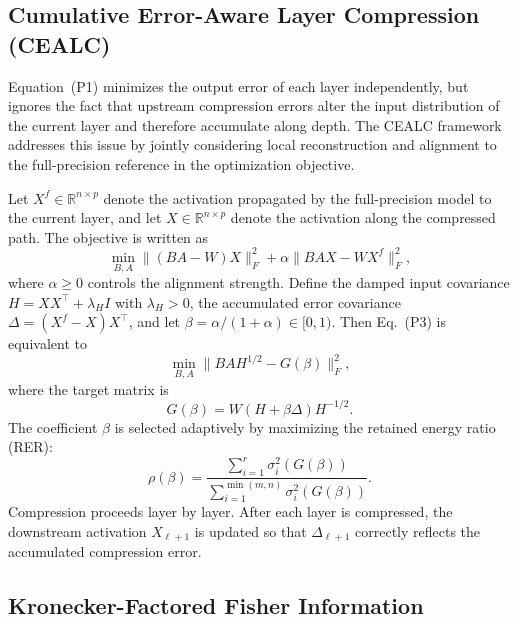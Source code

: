 \documentclass[a4paper,fleqn]{cas-dc}
\begin{document}
\subsection{Cumulative Error-Aware Layer Compression (CEALC)}

Equation~(P1) minimizes the output error of each layer independently, but ignores the fact that upstream compression errors alter the input distribution of the current layer and therefore accumulate along depth. The CEALC framework addresses this issue by jointly considering local reconstruction and alignment to the full-precision reference in the optimization objective.

Let $X^f \in \mathbb{R}^{n \times p}$ denote the activation propagated by the full-precision model to the current layer, and let $X \in \mathbb{R}^{n \times p}$ denote the activation along the compressed path. The objective is written as
\begin{equation}
\min_{B,A} \|(BA - W)X\|_F^2 + \alpha \|BAX - WX^f\|_F^2,
\tag{P3}
\end{equation}
where $\alpha \ge 0$ controls the alignment strength. Define the damped input covariance $H = XX^\top + \lambda_H I$ with $\lambda_H > 0$, the accumulated error covariance $\Delta = (X^f - X)X^\top$, and let $\beta = \alpha/(1+\alpha) \in [0,1)$. Then Eq.~(P3) is equivalent to
\begin{equation}
\min_{B,A} \|BAH^{1/2} - G(\beta)\|_F^2,
\tag{P4}
\end{equation}
where the target matrix is
\begin{equation}
G(\beta) = W(H + \beta \Delta)H^{-1/2}.
\tag{P5}
\end{equation}
The coefficient $\beta$ is selected adaptively by maximizing the retained energy ratio (RER):
\begin{equation}
\rho(\beta) = \frac{\sum_{i=1}^{r} \sigma_i^2(G(\beta))}{\sum_{i=1}^{\min(m,n)} \sigma_i^2(G(\beta))}.
\tag{P6}
\end{equation}
Compression proceeds layer by layer. After each layer is compressed, the downstream activation $X_{\ell+1}$ is updated so that $\Delta_{\ell+1}$ correctly reflects the accumulated compression error.

\subsection{Kronecker-Factored Fisher Information}
\end{document}
